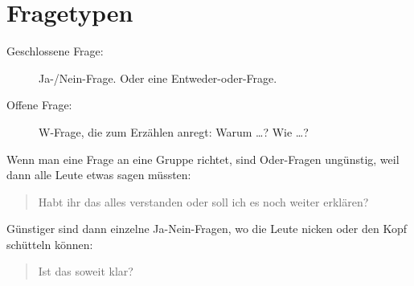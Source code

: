 \section{Fragetypen}
\label{fragetypen}

\begin{description}
    \item[Geschlossene Frage:] Ja-/Nein-Frage. Oder eine Entweder-oder-Frage.
    \item[Offene Frage:] W-Frage, die zum Erzählen anregt: Warum \ldots? Wie \ldots?
\end{description}

Wenn man eine Frage an eine Gruppe richtet, sind Oder-Fragen ungünstig, weil dann alle Leute etwas sagen müssten:

\begin{quotation}
    Habt ihr das alles verstanden oder soll ich es noch weiter erklären?
\end{quotation}

Günstiger sind dann einzelne Ja-Nein-Fragen, wo die Leute nicken oder den Kopf schütteln können:

\begin{quotation}
    Ist das soweit klar?
\end{quotation}
